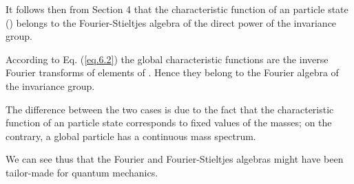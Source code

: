 \documentclass[a4paper,11pt]{article}
\begin{document}
It follows then from Section 4 that the characteristic function of an \coordHE{} particle state (\coordHE{}) 
belongs to the Fourier-Stieltjes algebra of the \coordHE{} direct power of the invariance group. 

According to Eq. (\ref{eq.6.2}) the global characteristic functions are the inverse Fourier 
transforms of elements of \coordHE{}. Hence they belong to the Fourier algebra of the 
invariance group. 

The difference between the two cases is due to the fact that the characteristic function of an 
\coordHE{} particle state corresponds to fixed values of the masses; on the contrary, a global 
particle has a continuous mass spectrum. 

We can see thus that the Fourier and Fourier-Stieltjes algebras 
might have been tailor-made for quantum mechanics.
\end{document}
